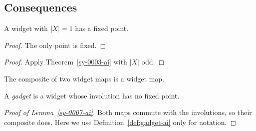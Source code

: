 \subsection{Consequences}\label{sy-0201-ai}

\begin{proposition}\label{sy-0006-ai}
A widget with $|X| = 1$ has a fixed point.
\end{proposition}
\begin{proof}
The only point is fixed.
\end{proof}
\begin{proof}
Apply Theorem~\ref{sy-0003-ai} with $|X|$ odd.
\end{proof}



\begin{lemma}[Deferred]\label{sy-0007-ai}
The composite of two widget maps is a widget map.
\end{lemma}


\begin{definition}[Gadget]\label{sy-0008-ai}\label{def:gadget-ai}\label{defn:gadget-old-ai}
A \emph{gadget} is a widget whose involution has no fixed point.
\end{definition}


\begin{proof}[Proof of Lemma~\ref{sy-0007-ai}]
Both maps commute with the involutions, so their composite does. Here we use Definition~\ref{def:gadget-ai} only for notation.
\end{proof}



